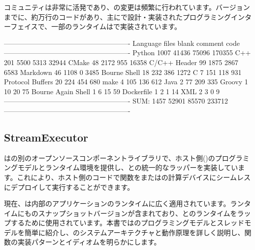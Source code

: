 \begin{content}
\tf{}コミュニティは非常に活発であり、の変更は頻繁に行われています。バージョンまでに、約万行のコードがあり、主にで設計・実装されたプログラミングインターフェイスで、一部のランタイムはで実装されています。

\begin{leftbar}
\begin{python}[caption={Contribコード統計}]
-------------------------------------------------------
Language            files     blank   comment      code
-------------------------------------------------------
Python               1007     41436     75096    170355
C++                   201      5500      5313     32944
CMake                  48      2172       955     16358
C/C++ Header           99      1875      2867      6583
Markdown               46      1108         0      3485
Bourne Shell           18       232       386      1272
C                       7       151       118       931
Protocol Buffers       20       224       454       680
make                    4       105       136       612
Java                    2        77       209       335
Groovy                  1        10        20        75
Bourne Again Shell      1         6        15        59
Dockerfile              1         2         1        14
XML                     2         3         0         9
-------------------------------------------------------
SUM:                 1457     52901     85570    233712
-------------------------------------------------------
\end{python}
\end{leftbar}

\subsection{StreamExecutor}

はの別のオープンソースコンポーネントライブラリで、ホスト側()のプログラミングモデルとランタイム環境を提供し、との統一的なラッパーを実装しています。これにより、ホスト側のコードで関数をまたはの計算デバイスにシームレスにデプロイして実行することができます。

現在、は内部のアプリケーションのランタイムに広く適用されています。\tf{}ランタイムにものスナップショットバージョンが含まれており、とのランタイムをラップするために使用されています。本書ではのプログラミングモデルとスレッドモデルを簡単に紹介し、のシステムアーキテクチャと動作原理を詳しく説明し、関数の実装パターンとイディオムを明らかにします。


\end{content}
